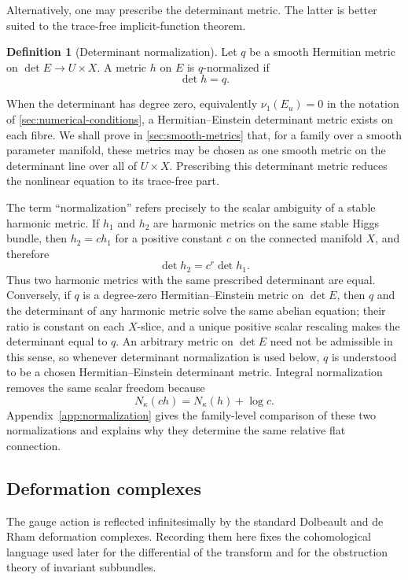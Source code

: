 \documentclass[11pt,reqno]{amsart}
\theoremstyle{definition}
\newtheorem{definition}[theorem]{Definition}
\theoremstyle{remark}
\begin{document}
Alternatively, one may prescribe the determinant metric.  The latter is better suited to the trace-free implicit-function theorem.

\begin{definition}[Determinant normalization]\label{def:det-normalization}
Let $q$ be a smooth Hermitian metric on $\det E\to U\times X$.  A metric $h$ on $E$ is $q$-normalized if
\[
  \det h=q.
\]
\end{definition}

When the determinant has degree zero, equivalently $\nu_1(E_u)=0$ in the notation of \cref{sec:numerical-conditions}, a Hermitian--Einstein determinant metric exists on each fibre.  We shall prove in \cref{sec:smooth-metrics} that, for a family over a smooth parameter manifold, these metrics may be chosen as one smooth metric on the determinant line over all of $U\times X$.  Prescribing this determinant metric reduces the nonlinear equation to its trace-free part.


The term ``normalization'' refers precisely to the scalar ambiguity of a stable harmonic metric.  If $h_1$ and $h_2$ are harmonic metrics on the same stable Higgs bundle, then $h_2=c h_1$ for a positive constant $c$ on the connected manifold $X$, and therefore
\[
  \det h_2=c^r\det h_1.
\]
Thus two harmonic metrics with the same prescribed determinant are equal.  Conversely, if $q$ is a degree-zero Hermitian--Einstein metric on $\det E$, then $q$ and the determinant of any harmonic metric solve the same abelian equation; their ratio is constant on each $X$-slice, and a unique positive scalar rescaling makes the determinant equal to $q$.  An arbitrary metric on $\det E$ need not be admissible in this sense, so whenever determinant normalization is used below, $q$ is understood to be a chosen Hermitian--Einstein determinant metric.  Integral normalization removes the same scalar freedom because
\[
  N_\kappa(c h)=N_\kappa(h)+\log c.
\]
Appendix~\ref{app:normalization} gives the family-level comparison of these two normalizations and explains why they determine the same relative flat connection.


\subsection{Deformation complexes}


The gauge action is reflected infinitesimally by the standard Dolbeault and de Rham deformation complexes.  Recording them here fixes the cohomological language used later for the differential of the transform and for the obstruction theory of invariant subbundles.
\end{document}

